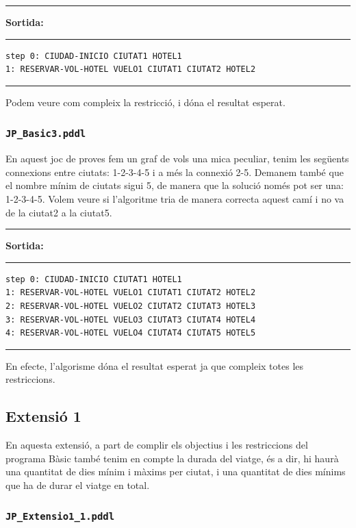 \documentclass[11pt,a4paper]{article}
\begin{document}
\begin{samepage}
\medskip
\noindent
\rule{0.1\textwidth}{0.5mm}
\textbf{Sortida:}
\rule{0.76\textwidth}{0.5mm}
\begin{verbatim}
step 0: CIUDAD-INICIO CIUTAT1 HOTEL1
1: RESERVAR-VOL-HOTEL VUELO1 CIUTAT1 CIUTAT2 HOTEL2
\end{verbatim}
\rule{\textwidth}{0.5mm}
\medskip
\end{samepage}

Podem veure com compleix la restricció, i dóna el resultat esperat.

\subsubsection*{\texttt{JP\_Basic3.pddl}}

En aquest joc de proves fem un graf de vols una mica peculiar, tenim les següents connexions entre ciutats: 1-2-3-4-5 i a més la connexió 2-5. Demanem també que el nombre mínim de ciutats sigui 5, de manera que la solució només pot ser una: 1-2-3-4-5. Volem veure si l'algoritme tria de manera correcta aquest camí i no va de la ciutat2 a la ciutat5.

\begin{samepage}
\medskip
\noindent
\rule{0.1\textwidth}{0.5mm}
\textbf{Sortida:}
\rule{0.76\textwidth}{0.5mm}
\begin{verbatim}
step 0: CIUDAD-INICIO CIUTAT1 HOTEL1
1: RESERVAR-VOL-HOTEL VUELO1 CIUTAT1 CIUTAT2 HOTEL2
2: RESERVAR-VOL-HOTEL VUELO2 CIUTAT2 CIUTAT3 HOTEL3
3: RESERVAR-VOL-HOTEL VUELO3 CIUTAT3 CIUTAT4 HOTEL4
4: RESERVAR-VOL-HOTEL VUELO4 CIUTAT4 CIUTAT5 HOTEL5
\end{verbatim}
\rule{\textwidth}{0.5mm}
\medskip
\end{samepage}

En efecte, l'algorisme dóna el resultat esperat ja que compleix totes les restriccions.

\subsection{Extensió 1}

En aquesta extensió, a part de complir els objectius i les restriccions del programa Bàsic també tenim en compte la durada del viatge, és a dir, hi haurà una quantitat de dies mínim i màxims per ciutat, i una quantitat de dies mínims que ha de durar el viatge en total.

\subsubsection*{\texttt{JP\_Extensio1\_1.pddl}}
\end{document}
